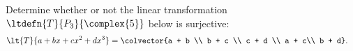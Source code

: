 Determine whether or not the linear transformation $\ltdefn{T}{P_3}{\complex{5}}$ below is surjective: 
%
\begin{align*}
\lt{T}{a + bx + cx^2 + dx^3} &= \colvector{a + b \\ b + c \\ c + d \\ a + c\\ b + d}.
\end{align*}
%